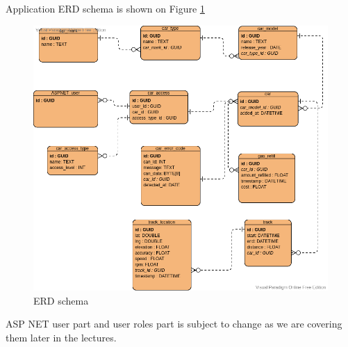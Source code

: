 Application ERD schema is shown on Figure
\ref{fig:erd-schema}

\begin{figure}[h]
    \includegraphics[width=\textwidth]{figures/erd_schema}
    \caption{ERD schema}
    \label{fig:erd-schema}
\end{figure}

ASP NET user part and user roles part is subject to change as we are covering them later in the lectures.